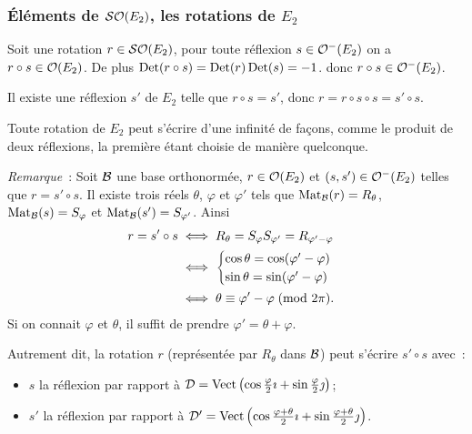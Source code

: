 \subsubsection{Éléments de \(\mathcal{SO}\!\left(E_2\right)\), les rotations de \(E_2\)}

Soit une rotation \(r \in \mathcal{SO}\!\left(E_2\right)\), pour toute réflexion \(s \in 
\mathcal{O}^{-}\!\left(E_2\right)\) on a \(r \circ s \in \mathcal{O}\!\left(E_2\right)\). De plus \(\operatorname{Det}(r \circ 
s)=\operatorname{Det}(r) \operatorname{Det}(s)=-1\). donc \(r \circ s \in \mathcal{O}^{-}\!\left(E_2\right)\).

Il existe une réflexion \(s'\) de \(E_2\) telle que \(r \circ s=s'\), donc 
\(r=r \circ s \circ s= s'\circ s\).

\begin{theo}
  Toute rotation de \(E_2\) peut s'écrire d'une infinité de façons, comme le 
  produit de deux réflexions, la première étant choisie de manière 
  quelconque.
\end{theo}

\emph{Remarque}~: Soit \(\mathcal{B}\) une base orthonormée, \(r \in \mathcal{O}\!\left(E_2\right)\) et 
\((s,s') \in \mathcal{O}^{-}\!\left(E_2\right)\) telles que \(r=s' \circ s\). Il existe trois 
réels \(\theta\), \(\varphi\) et \(\varphi'\) tels que 
\(\mathrm{Mat}_{\mathcal{B}}(r)=R_\theta\), \(\mathrm{Mat}_{\mathcal{B}}(s)=S_\varphi\) et 
\(\mathrm{Mat}_{\mathcal{B}}(s')=S_{\varphi'}\). Ainsi
\begin{align*}
  r = s' \circ s &\iff  R_\theta = S_\varphi 
  S_{\varphi'}=R_{\varphi'-\varphi} \\
  &\iff \begin{cases} \cos \theta = \cos(\varphi'-\varphi) \\\sin \theta = 
  \sin(\varphi'-\varphi) \end{cases}\\
  &\iff \theta \equiv \varphi'-\varphi\!\pmod {2\pi}.
\end{align*}
Si on connait \(\varphi\) et \(\theta\), il suffit de prendre 
\(\varphi'=\theta +\varphi\).

Autrement dit, la rotation \(r\) (représentée par \(R_\theta\) dans \(\mathcal{B}\)) 
peut s'écrire \(s' \circ s\) avec~:
\begin{itemize}
  \item \(s\) la réflexion par rapport à \(\mathcal{D} = 
    \operatorname{Vect}\left(\cos\frac{\varphi}{2}\imath + 
    \sin\frac{\varphi}{2}\jmath\right)\);
  \item \(s'\) la réflexion par rapport à \(\mathcal{D}' = 
    \operatorname{Vect}\left(\cos\frac{\varphi+\theta}{2}\imath + 
    \sin\frac{\varphi+\theta}{2}\jmath\right)\).
\end{itemize}

